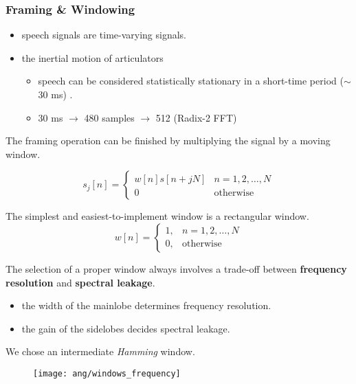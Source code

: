 \begin{frame}
\frametitle{Framing \& Windowing}
\begin{itemize}
	\item speech signals are time-varying signals.
	\item the inertial motion of articulators
	\begin{itemize}
		\item speech can be considered statistically stationary in a short-time period ($\sim$ 30 ms) \cite{brandstein1995practical}.
		\item 30 ms $\longrightarrow$ 480 samples $\longrightarrow$ 512 (Radix-2 FFT)
	\end{itemize}
\end{itemize}
\end{frame}


\begin{frame}
The framing operation can be finished by multiplying the signal by a moving window.

\begin{equation}
s_j[n] =
\begin{cases}
w[n] s[n+jN] & n = 1, 2, \dots, N\\
0 & \text{otherwise}
\end{cases}
\end{equation}

The simplest and easiest-to-implement window is a rectangular window.
\begin{equation}
w[n] =
\begin{cases}
1, & n = 1, 2, \dots, N\\
0, & \text{otherwise}
\end{cases}
\end{equation}
\end{frame}


\begin{frame}
The selection of a proper window always involves a trade-off between \textbf{frequency resolution} and \textbf{spectral leakage}.

\begin{itemize}
\item the width of the mainlobe determines frequency resolution.
\item the gain of the sidelobes decides spectral leakage.
\end{itemize}
We chose an intermediate \textit{Hamming} window.

\begin{figure}[H]
\centering
\texttt{[image: ang/windows\_frequency]}
\end{figure}
\end{frame}

